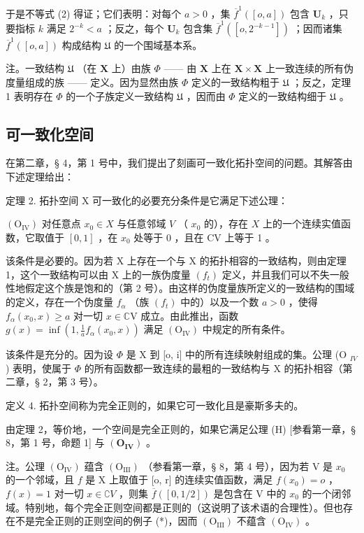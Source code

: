 于是不等式 (2) 得证；它们表明：对每个 \(a > 0\) ，集 \(\overline{f}^{1}([o, a])\) 包含 \(\mathbf{U}_{k}\) ，只要指标 \(k\) 满足 \(2^{-k} < a\) ；反之，每个 \(\mathbf{U}_{k}\) 包含集 \(\overline{f}^{1}([o, 2^{-k-1}])\) ；因而诸集 \(\overline{f}^{1}([o, a])\) 构成结构 \(\mathfrak{U}\) 的一个围域基本系。

注。一致结构 \(\mathfrak{U}\) （在 \(\mathbf{X}\) 上）由族 \(\Phi\) —— 由 \(\mathbf{X}\) 上在 \(\mathbf{X} \times \mathbf{X}\) 上一致连续的所有伪度量组成的族 —— 定义。因为显然由族 \(\Phi\) 定义的一致结构粗于 \(\mathfrak{U}\) ；反之，定理 1 表明存在 \(\Phi\) 的一个子族定义一致结构 \(\mathfrak{U}\) ，因而由 \(\Phi\) 定义的一致结构细于 \(\mathfrak{U}\) 。

\subsection{可一致化空间}

在第二章，§ 4，第 1 号中，我们提出了刻画可一致化拓扑空间的问题。其解答由下述定理给出：

定理 2. 拓扑空间 X 可一致化的必要充分条件是它满足下述公理：

\((\mathrm{O}_{\mathrm{IV}})\) 对任意点 \(x_0 \in X\) 与任意邻域 \(V\) （ \(x_0\) 的），存在 \(X\) 上的一个连续实值函数，它取值于 \([0,1]\) ，在 \(x_0\) 处等于 0 ，且在 CV 上等于 1 。

该条件是必要的。因为若 X 上存在一个与 X 的拓扑相容的一致结构，则由定理 1，这个一致结构可以由 X 上的一族伪度量 \((f_{t})\) 定义，并且我们可以不失一般性地假定这个族是饱和的（第 2 号）。由这样的伪度量族所定义的一致结构的围域的定义，存在一个伪度量 \(f_{\alpha}\) （族 \((f_{t})\) 中的）以及一个数 \(a > 0\) ，使得 \(f_{\alpha}(x_0, x) \geqslant a\) 对一切 \(x \in \mathbb{C}\mathrm{V}\) 成立。由此推出，函数 \(g(x) = \inf \left(1, \frac{1}{a} f_{\alpha}(x_0, x)\right)\) 满足 \((\mathrm{O}_{\mathrm{IV}})\) 中规定的所有条件。

该条件是充分的。因为设 \(\Phi\) 是 X 到 {[}o, i{]} 中的所有连续映射组成的集。公理 (O \(_{IV}\) ) 表明，使属于 \(\Phi\) 的所有函数都一致连续的最粗的一致结构与 X 的拓扑相容（第二章，§ 2，第 3 号）。

定义 4. 拓扑空间称为完全正则的，如果它可一致化且是豪斯多夫的。

由定理 2，等价地，一个空间是完全正则的，如果它满足公理 (H) {[}参看第一章，§ 8，第 1 号，命题 1{]} 与 \((\mathbf{O}_{\mathbf{IV}})\) 。

注。公理 \((\mathrm{O}_{\mathrm{IV}})\) 蕴含 \((\mathrm{O}_{\mathrm{III}})\) （参看第一章，§ 8，第 4 号），因为若 V 是 \(x_0\) 的一个邻域，且 \(f\) 是 X 上取值于 {[}o, r{]} 的连续实值函数，满足 \(f(x_0) = o\) ，\(f(x) = 1\) 对一切 \(x \in \complement V\) ，则集 \(\overline{f}([0, 1/2])\) 是包含在 V 中的 \(x_0\) 的一个闭邻域。特别地，每个完全正则空间都是正则的（这说明了该术语的合理性）。但也存在不是完全正则的正则空间的例子 (*)，因而 \((\mathrm{O}_{\mathrm{III}})\) 不蕴含 \((\mathrm{O}_{\mathrm{IV}})\) 。

